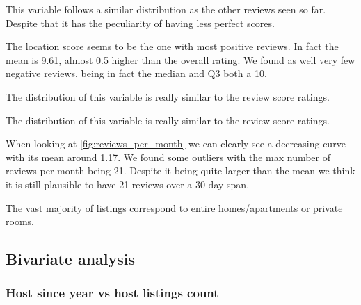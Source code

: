 
This variable follows a similar distribution as the other reviews seen so far.
Despite that it has the peculiarity of having less perfect scores.



The location score seems to be the one with most positive reviews. In fact the
mean is 9.61, almost 0.5 higher than the overall rating. We found as well very
few negative reviews, being in fact the median and Q3 both a 10.



The distribution of this variable is really similar to the review score ratings.



The distribution of this variable is really similar to the review score ratings.





When looking at \cref{fig:reviews_per_month} we can clearly see a decreasing
curve with its mean around 1.17. We found some outliers with the max number of
reviews per month being 21. Despite it being quite larger than the mean we think
it is still plausible to have 21 reviews over a 30 day span.


The vast majority of listings correspond to entire homes/apartments or private
rooms.

\pagebreak
\subsection{Bivariate analysis}%
\label{sub:bivariate_analysis}

\subsubsection{Host since year vs host listings count}




